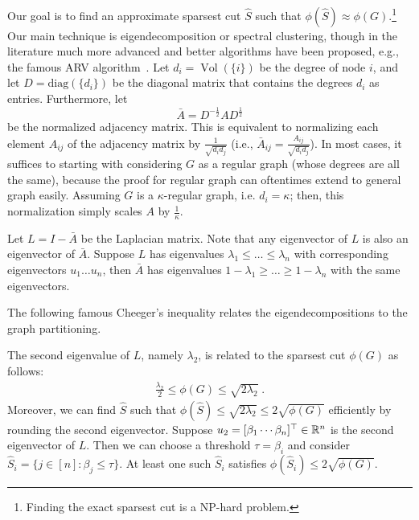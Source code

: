 Our goal is to find an approximate sparsest cut $\hat{S}$ such that $\phi(\hat{S}) \approx \phi(G)$.\footnote{Finding the exact sparsest cut is a NP-hard problem.} Our main technique is eigendecomposition or spectral clustering, though in the literature much more advanced and better algorithms have been proposed, e.g., the famous ARV algorithm~\cite{arora2009expander}. Let $d_i = \operatorname{Vol}(\{i\})$ be the degree of node $i$, and let $D = \text{diag}(\{d_i\})$ be the diagonal matrix that contains the degrees $d_i$ as entries. Furthermore, let 
\begin{equation}
    \bar{A} = D^{-\frac{1}{2}} A D^{\frac{1}{2}}
\end{equation}
be the normalized adjacency matrix. This is equivalent to normalizing each element $A_{ij}$ of the adjacency matrix by $\frac{1}{\sqrt{d_i d_j}}$ (i.e., $\bar{A}_{ij} = \frac{A_{ij}}{\sqrt{d_i d_j}}$).
In most cases, it suffices to starting with considering $G$ as a regular graph (whose degrees are all the same), because the proof for regular graph can oftentimes extend to general graph easily. Assuming $G$ is a $\kappa$-regular graph, i.e. $d_i = \kappa$; then, this normalization simply scales $A$ by $\frac{1}{\kappa}$.

 Let $L = I - \bar{A}$ be the Laplacian matrix. Note that any eigenvector of $L$ is also an eigenvector of $\bar{A}$. Suppose $L$ has eigenvalues $\lambda_1 \leq \hdots \leq \lambda_n$ with corresponding eigenvectors $u_1 \hdots u_n$, then $\bar{A}$ has eigenvalues $1 - \lambda_1 \geq \hdots \geq 1 - \lambda_n$ with the same eigenvectors.
 
 The following famous Cheeger's inequality relates the eigendecompositions to the graph partitioning. 

\begin{theorem}
The second eigenvalue of $L$, namely $\lambda_2$, is related to the sparsest cut $\phi(G)$ as follows:
\begin{align}
    \frac{\lambda_2}{2} \leq \phi(G) \leq \sqrt{2 \lambda_2} \;.
\end{align}
Moreover, we can find $\hat{S}$ such that $\phi(\hat{S}) \leq \sqrt{2 \lambda_2} \leq 2 \sqrt{\phi(G)}$ efficiently by rounding the second eigenvector. Suppose $u_2 = [\beta_1 \cdots \beta_n]^\top \in \mathbb R^n$ is the second eigenvector of $L$. Then we can choose a threshold $\tau = \beta_i$ and consider $\hat{S}_i = \{ j \in [n] : \beta_j \leq \tau \}$. At least one such $\hat{S}_i$ satisfies $\phi(\hat{S}_i) \leq 2 \sqrt{\phi(G)}$.
\end{theorem}

